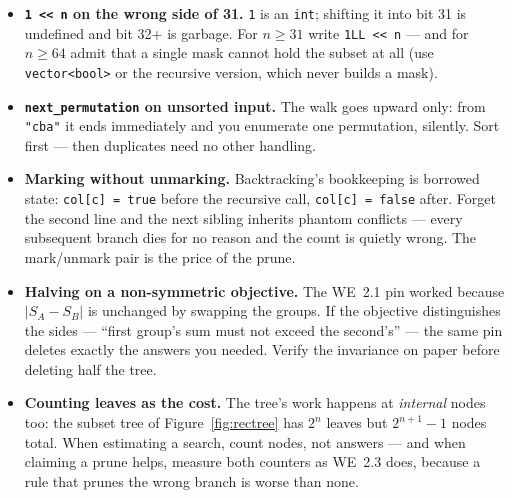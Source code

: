\begin{itemize}
\item \textbf{\texttt{1 << n} on the wrong side of 31.} \texttt{1} is an
\texttt{int}; shifting it into bit 31 is undefined and bit 32+ is garbage.
For $n \ge 31$ write \texttt{1LL << n} --- and for $n \ge 64$ admit that a
single mask cannot hold the subset at all (use \texttt{vector<bool>} or the
recursive version, which never builds a mask).
\item \textbf{\texttt{next\_permutation} on unsorted input.} The walk goes
upward only: from \texttt{"cba"} it ends immediately and you enumerate one
permutation, silently. Sort first --- then duplicates need no other handling.
\item \textbf{Marking without unmarking.} Backtracking's bookkeeping is
borrowed state: \texttt{col[c] = true} before the recursive call,
\texttt{col[c] = false} after. Forget the second line and the next sibling
inherits phantom conflicts --- every subsequent branch dies for no reason and
the count is quietly wrong. The mark/unmark pair is the price of the prune.
\item \textbf{Halving on a non-symmetric objective.} The WE~2.1 pin worked
because $|S_A - S_B|$ is unchanged by swapping the groups. If the objective
distinguishes the sides --- ``first group's sum must not exceed the
second's'' --- the same pin deletes exactly the answers you needed. Verify
the invariance on paper before deleting half the tree.
\item \textbf{Counting leaves as the cost.} The tree's work happens at
\emph{internal} nodes too: the subset tree of Figure~\ref{fig:rectree} has
$2^n$ leaves but $2^{n+1} - 1$ nodes total. When estimating a search, count
nodes, not answers --- and when claiming a prune helps, measure both counters
as WE~2.3 does, because a rule that prunes the wrong branch is worse than
none.
\end{itemize}

